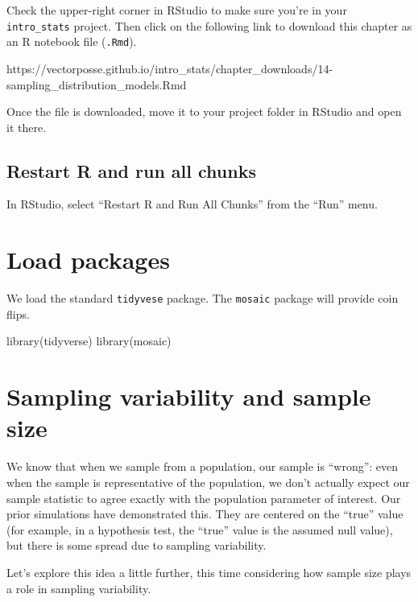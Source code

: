 \documentclass[
]{book}
\newenvironment{Shaded}{\begin{snugshade}}{\end{snugshade}}
\newcommand{\FunctionTok}[1]{\textcolor[rgb]{0.00,0.00,0.00}{#1}}
\newcommand{\NormalTok}[1]{#1}
\begin{document}
Check the upper-right corner in RStudio to make sure you're in your \texttt{intro\_stats} project. Then click on the following link to download this chapter as an R notebook file (\texttt{.Rmd}).

https://vectorposse.github.io/intro\_stats/chapter\_downloads/14-sampling\_distribution\_models.Rmd

Once the file is downloaded, move it to your project folder in RStudio and open it there.

\hypertarget{samp-dist-models-restart}{%
\subsection{Restart R and run all chunks}\label{samp-dist-models-restart}}

In RStudio, select ``Restart R and Run All Chunks'' from the ``Run'' menu.

\hypertarget{samp-dist-models-load}{%
\section{Load packages}\label{samp-dist-models-load}}

We load the standard \texttt{tidyvese} package. The \texttt{mosaic} package will provide coin flips.

\begin{Shaded}
\begin{Highlighting}[]
\FunctionTok{library}\NormalTok{(tidyverse)}
\FunctionTok{library}\NormalTok{(mosaic)}
\end{Highlighting}
\end{Shaded}

\hypertarget{samp-dist-models-sampling-variability}{%
\section{Sampling variability and sample size}\label{samp-dist-models-sampling-variability}}

We know that when we sample from a population, our sample is ``wrong'': even when the sample is representative of the population, we don't actually expect our sample statistic to agree exactly with the population parameter of interest. Our prior simulations have demonstrated this. They are centered on the ``true'' value (for example, in a hypothesis test, the ``true'' value is the assumed null value), but there is some spread due to sampling variability.

Let's explore this idea a little further, this time considering how sample size plays a role in sampling variability.
\end{document}
